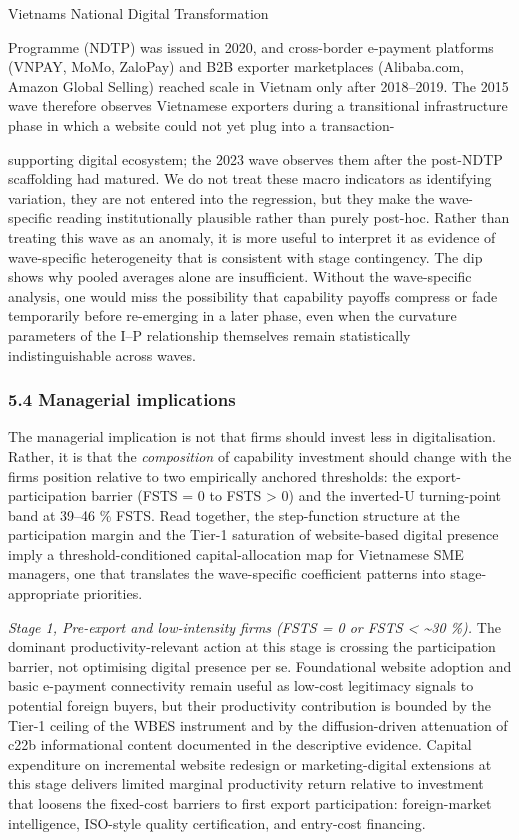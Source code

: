 \documentclass[12pt,a4paper]{article}
\begin{document}
Vietnam\textquotesingle s National Digital Transformation

Programme (NDTP) was issued in 2020, and cross-border e-payment
platforms (VNPAY, MoMo, ZaloPay) and B2B exporter marketplaces
(Alibaba.com, Amazon Global Selling) reached scale in Vietnam only after
2018--2019. The 2015 wave therefore observes Vietnamese exporters during
a transitional infrastructure phase in which a website could not yet
plug into a transaction-

supporting digital ecosystem; the 2023 wave observes them after the
post-NDTP scaffolding had matured. We do not treat these macro
indicators as identifying variation, they are not entered into the
regression, but they make the wave-specific reading institutionally
plausible rather than purely post-hoc. Rather than treating this wave as
an anomaly, it is more useful to interpret it as evidence of
wave-specific heterogeneity that is consistent with stage contingency.
The dip shows why pooled averages alone are insufficient. Without the
wave-specific analysis, one would miss the possibility that capability
payoffs compress or fade temporarily before re-emerging in a later
phase, even when the curvature parameters of the I--P relationship
themselves remain statistically indistinguishable across waves.

\hypertarget{54-managerial-implications}{%
\subsubsection{5.4 Managerial
implications}\label{54-managerial-implications}}

The managerial implication is not that firms should invest less in
digitalisation. Rather, it is that the \emph{composition} of capability
investment should change with the firm\textquotesingle s position
relative to two empirically anchored thresholds: the
export-participation barrier (FSTS = 0 to FSTS \textgreater{} 0) and the
inverted-U turning-point band at 39--46 \% FSTS. Read together, the
step-function structure at the participation margin and the Tier-1
saturation of website-based digital presence imply a
threshold-conditioned capital-allocation map for Vietnamese SME
managers, one that translates the wave-specific coefficient patterns
into stage-appropriate priorities.

\emph{Stage 1, Pre-export and low-intensity firms (FSTS = 0 or FSTS
\textless{} \textasciitilde30 \%).} The dominant productivity-relevant
action at this stage is crossing the participation barrier, not
optimising digital presence per se. Foundational website adoption and
basic e-payment connectivity remain useful as low-cost legitimacy
signals to potential foreign buyers, but their productivity contribution
is bounded by the Tier-1 ceiling of the WBES instrument and by the
diffusion-driven attenuation of c22b informational content documented in
the descriptive evidence. Capital expenditure on incremental website
redesign or marketing-digital extensions at this stage delivers limited
marginal productivity return relative to investment that loosens the
fixed-cost barriers to first export participation: foreign-market
intelligence, ISO-style quality certification, and entry-cost financing.
\end{document}
